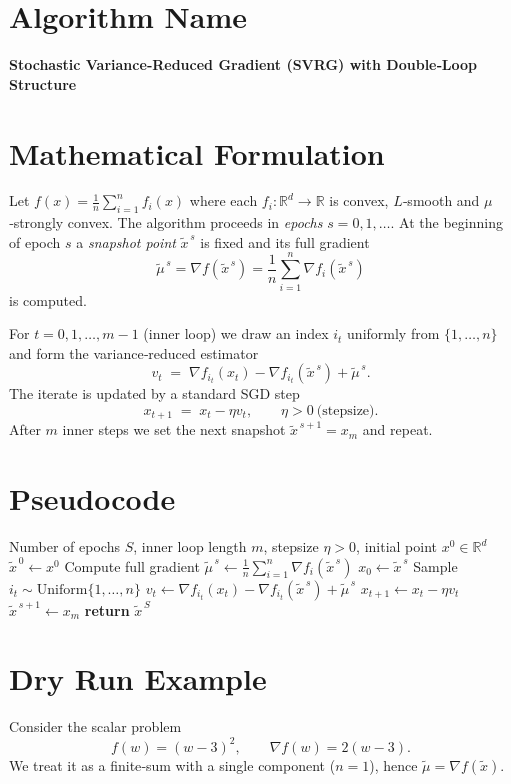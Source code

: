 \documentclass{article}
\newcommand{\R}{\mathbb{R}}
\begin{document}
\section*{Algorithm Name}
\textbf{Stochastic Variance‑Reduced Gradient (SVRG) with Double‑Loop Structure}

\section*{Mathematical Formulation}
Let $f(x)=\frac1n\sum_{i=1}^{n} f_i(x)$ where each $f_i:\R^d\to\R$ is convex, $L$‑smooth and $\mu$‑strongly convex.  
The algorithm proceeds in \emph{epochs} $s=0,1,\dots$.  
At the beginning of epoch $s$ a \emph{snapshot point} $\tilde{x}^{\,s}$ is fixed and its full gradient
\[
\tilde{\mu}^{\,s}= \nabla f(\tilde{x}^{\,s})=\frac1n\sum_{i=1}^{n}\nabla f_i(\tilde{x}^{\,s})
\]
is computed.

For $t=0,1,\dots,m-1$ (inner loop) we draw an index $i_t$ uniformly from $\{1,\dots,n\}$ and form the variance‑reduced estimator
\[
v_t \;=\; \nabla f_{i_t}(x_t)-\nabla f_{i_t}(\tilde{x}^{\,s})+\tilde{\mu}^{\,s}.
\tag{1}
\]
The iterate is updated by a standard SGD step
\[
x_{t+1}\;=\;x_t-\eta v_t ,\qquad \eta>0\ \text{(stepsize)}.
\tag{2}
\]
After $m$ inner steps we set the next snapshot $\tilde{x}^{\,s+1}=x_m$ and repeat.

\section*{Pseudocode}
\begin{algorithm}[H]
\caption{SVRG}
\begin{algorithmic}[1]
\Require Number of epochs $S$, inner loop length $m$, stepsize $\eta>0$, initial point $x^{0}\in\R^{d}$
\State $\tilde{x}^{\,0}\gets x^{0}$
    \State Compute full gradient $\tilde{\mu}^{\,s}\gets \frac1n\sum_{i=1}^{n}\nabla f_i(\tilde{x}^{\,s})$
    \State $x_0 \gets \tilde{x}^{\,s}$
        \State Sample $i_t\sim\text{Uniform}\{1,\dots,n\}$
        \State $v_t \gets \nabla f_{i_t}(x_t)-\nabla f_{i_t}(\tilde{x}^{\,s})+\tilde{\mu}^{\,s}$   
        \State $x_{t+1}\gets x_t-\eta v_t$
    \EndFor
    \State $\tilde{x}^{\,s+1}\gets x_m$
\EndFor
\State \textbf{return} $\tilde{x}^{\,S}$
\end{algorithmic}
\end{algorithm}

\section*{Dry Run Example}
Consider the scalar problem
\[
f(w)= (w-3)^2,\qquad \nabla f(w)=2(w-3).
\]
We treat it as a finite‑sum with a single component ($n=1$), hence $\tilde{\mu}= \nabla f(\tilde{x})$.
\end{document}
